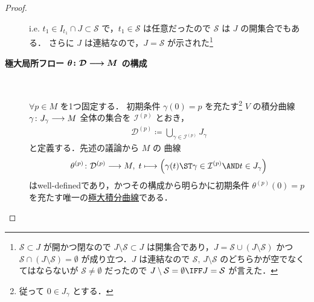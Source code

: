 \documentclass[TQFT_main]{subfiles}
\begin{document}
\begin{proof}
\begin{description}
        i.e. $t_1 \in I_{t_1} \cap J \subset \mathcal{S}$ で，$t_1 \in \mathcal{S}$ は任意だったので $\mathcal{S}$ は $J$ の開集合でもある．
        さらに $J$ は連結なので，$J = \mathcal{S}$ が示された\footnote{$\mathcal{S} \subset J$ が開かつ閉なので $J \setminus \mathcal{S} \subset J$ は開集合であり，$J = \mathcal{S} \cup (J\setminus \mathcal{S})$ かつ $\mathcal{S} \cap (J \setminus \mathcal{S}) = \emptyset$ が成り立つ．$J$ は連結なので $\mathcal{S},\, J \setminus \mathcal{S}$ のどちらかが空でなくてはならないが $\mathcal{S} \neq \emptyset$ だったので $J \setminus \mathcal{S} = \emptyset \IFF J = \mathcal{S}$ が言えた．}
        \item[\textbf{極大局所フロー $\bm{\theta \colon \mathcal{D} \longrightarrow M}$ の構成}]　
        
        $\forall p \in M$ を1つ固定する．
        初期条件 $\gamma (0) = p$ を充たす\footnote{従って $0 \in J_\gamma$ とする．} $V$ の積分曲線 $\gamma \colon J_\gamma \longrightarrow M$ 全体の集合を $\mathcal{I}^{(p)}$ とおき，
        \begin{align}
            \mathcal{D}^{(p)} \coloneqq \bigcup_{\gamma \in \mathcal{I}^{(p)}} J_\gamma
        \end{align}
        と定義する．先述の議論から $M$ の \cinfty 曲線
        \begin{align}
            \theta^{(p)} \colon \mathcal{D}^{(p)} \lto M,\; t \lmto \Bigl( \gamma(t) \ST \gamma \in \mathcal{I}^{(p)} \AND t \in J_\gamma \Bigr)
        \end{align}
        はwell-definedであり，かつその構成から明らかに初期条件 $\theta^{(p)} (0) = p$ を充たす唯一の\hyperref[def:local-flow]{極大積分曲線}である．
        

\end{description}
\end{proof}
\end{document}
